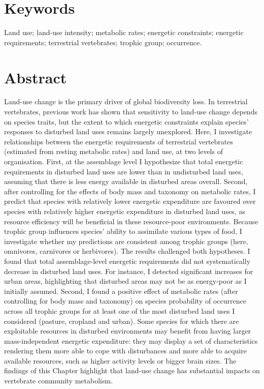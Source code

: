 
\section*{Keywords}
Land use; land-use intensity; metabolic rates; energetic constraints; energetic requirements; terrestrial vertebrates; trophic group; occurrence.

\section*{Abstract}
Land-use change is the primary driver of global biodiversity loss. In terrestrial vertebrates, previous work has shown that sensitivity to land-use change depends on species traits, but the extent to which energetic constraints explain species' responses to disturbed land uses remains largely unexplored. Here, I investigate relationships between the energetic requirements of terrestrial vertebrates (estimated from resting metabolic rates) and land use, at two levels of organisation. First, at the assemblage level I hypothesize that total energetic requirements in disturbed land uses are lower than in undisturbed land uses, assuming that there is less energy available in disturbed areas overall. Second, after controlling for the effects of body mass and taxonomy on metabolic rates, I predict that species with relatively lower energetic expenditure are favoured over species with relatively higher energetic expenditure in disturbed land uses, as resource efficiency will be beneficial in these resource-poor environments. Because trophic group   influences species' ability to assimilate various types of food, I investigate whether my predictions are consistent among trophic groups (here, omnivores, carnivores or herbivores).
The results challenged both hypotheses. I found that total assemblage-level energetic requirements did not systematically decrease in disturbed land uses. For instance, I detected significant increases for urban areas, highlighting that disturbed areas may not be as energy-poor as I initially assumed. Second, I found a positive effect of metabolic rates (after controlling for body mass and taxonomy) on species probability of occurrence across all trophic groups for at least one of the most disturbed land uses I considered (pasture, cropland and urban). Some species for which there are exploitable resources in disturbed environments may benefit from having larger mass-independent energetic expenditure: they may display a set of characteristics rendering them more able to cope with disturbances and more able to acquire available resources, such as higher activity levels or bigger brain sizes. The findings of this Chapter highlight that land-use change has substantial impacts on vertebrate community metabolism.   


